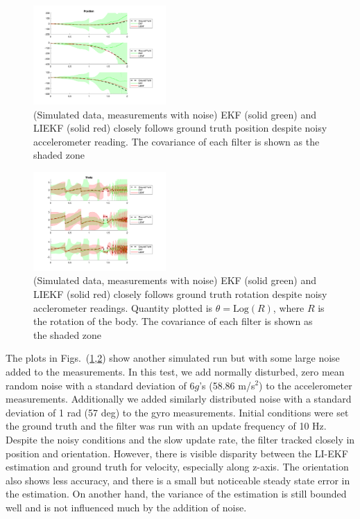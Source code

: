 \begin{figure}
    \centering
    \includegraphics[width=0.45\textwidth]{sections/figures/fake_data_position_noise.png}
    \caption{(Simulated data, measurements with noise) EKF (solid green) and LIEKF (solid red) closely follows ground truth position despite noisy accelerometer reading. The covariance of each filter is shown as the shaded zone}
    \label{fig:fake_data_pos_noise}
\end{figure}

\begin{figure}
    \centering
    \includegraphics[width=0.45\textwidth]{sections/figures/fake_data_theta_noise.png}
    \caption{(Simulated data, measurements with noise) EKF (solid green) and LIEKF (solid red) closely follows ground truth rotation despite noisy acclerometer readings. Quantity plotted is $\theta = \mathrm{Log}(R)$, where $R$ is the rotation of the body. The covariance of each filter is shown as the shaded zone}
    \label{fig:fake_data_ang_noise}
\end{figure}

The plots in Figs.~(\ref{fig:fake_data_pos_noise},\ref{fig:fake_data_ang_noise}) show another simulated run but with some large noise added to the measurements.  In this test, we add normally disturbed, zero mean random noise with a standard deviation of 6$g$'s (58.86 m/s$^2$) to the accelerometer measurements.  Additionally we added similarly distributed noise with a standard deviation of 1 rad (57 deg) to the gyro measurements.  Initial conditions were set the ground truth and the filter was run with an update frequency of 10 Hz.  Despite the noisy conditions and the slow update rate, the filter tracked closely in position and orientation. However, there is visible disparity between the LI-EKF estimation and ground truth for velocity, especially along z-axis.  The orientation also shows less accuracy, and there is a small but noticeable steady state error in the estimation.  On another hand, the variance of the estimation is still bounded well and is not influenced much by the addition of noise.



